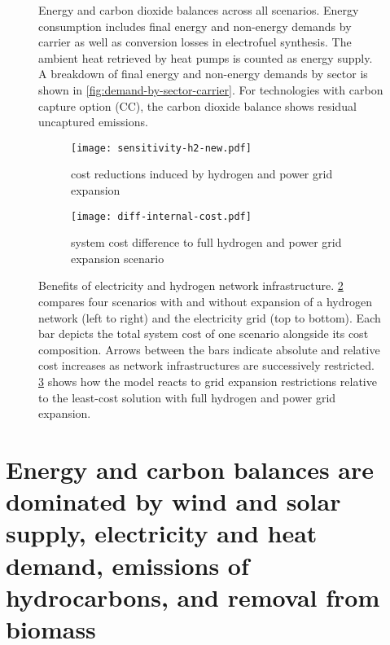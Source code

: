 

\begin{figure}
    \centering
     \caption{ Energy and carbon dioxide balances across all scenarios. Energy
    consumption includes final energy and non-energy demands by carrier as well
    as conversion losses in electrofuel synthesis. The ambient heat retrieved by
    heat pumps is counted as energy supply. A breakdown of final energy and
    non-energy demands by sector is shown in
    \cref{fig:demand-by-sector-carrier}. For technologies with carbon capture
    option (CC), the carbon dioxide balance shows residual uncaptured emissions.
    }
    \label{fig:balance}
\end{figure}

\begin{figure}
    \centering
    \begin{subfigure}[t]{\textwidth}
        \centering
        \caption{cost reductions induced by hydrogen and power grid expansion}
        \texttt{[image: sensitivity-h2-new.pdf]}
        \label{fig:sensitivity-h2-a}
    \end{subfigure}
    \begin{subfigure}[t]{\textwidth}
        \centering
        \caption{system cost difference to full hydrogen and power grid expansion scenario}
        \texttt{[image: diff-internal-cost.pdf]}
        \label{fig:sensitivity-h2-b}
    \end{subfigure}
    \caption{Benefits of electricity and hydrogen network infrastructure.
    \cref{fig:sensitivity-h2-a} compares four scenarios with and without
    expansion of a hydrogen network (left to right) and the electricity grid
    (top to bottom). Each bar depicts the total system cost of one scenario
    alongside its cost composition. Arrows between the bars indicate absolute
    and relative cost increases as network infrastructures are successively
    restricted. \cref{fig:sensitivity-h2-b} shows how the model reacts to grid
    expansion restrictions relative to the least-cost solution with full hydrogen and power grid expansion.}
    \label{fig:sensitivity-h2}
\end{figure}


\section*{Energy and carbon balances are dominated by wind and solar supply, electricity and heat demand, emissions of hydrocarbons, and removal from biomass}
\label{sec:balances}

